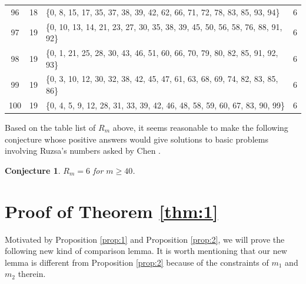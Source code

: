 \documentclass[12pt,a4paper,reqno]{amsart}
\numberwithin{equation}{section}
\theoremstyle{plain}
\newtheorem{conjecture}{Conjecture}
\theoremstyle{definition}
\begin{document}
\begin{longtable}{c|c|>{\raggedright\arraybackslash}p{}|c}
96 & 18 & \{0, 8, 15, 17, 35, 37, 38, 39, 42, 62, 66, 71, 72, 78, 83, 85, 93, 94\} & 6\\
97 & 19 & \{0, 10, 13, 14, 21, 23, 27, 30, 35, 38, 39, 45, 50, 56, 58, 76, 88, 91, 92\} & 6\\
98 & 19 & \{0, 1, 21, 25, 28, 30, 43, 46, 51, 60, 66, 70, 79, 80, 82, 85, 91, 92, 93\} & 6\\
99 & 19 & \{0, 3, 10, 12, 30, 32, 38, 42, 45, 47, 61, 63, 68, 69, 74, 82, 83, 85, 86\} & 6\\
100 & 19 & \{0, 4, 5, 9, 12, 28, 31, 33, 39, 42, 46, 48, 58, 59, 60, 67, 83, 90, 99\} & 6\\
\end{longtable}
\endgroup
Based on the table list of $R_m$ above, it seems reasonable  to make the following conjecture whose positive answers would give solutions to basic problems involving Ruzsa's numbers asked by Chen \cite[Problem 1 and Problem 2]{Ch08}.

\begin{conjecture}\label{value}
    $R_m=6$ for $m\ge 40$.
\end{conjecture}


\section{Proof of Theorem \ref{thm:1}}
 Motivated by Proposition \ref{prop:1} and Proposition \ref{prop:2}, we will prove the following new kind of comparison lemma. It is worth mentioning that our new lemma is different from Proposition \ref{prop:2} because of the constraints of $m_1$ and $m_2$ therein. 
\end{document}
